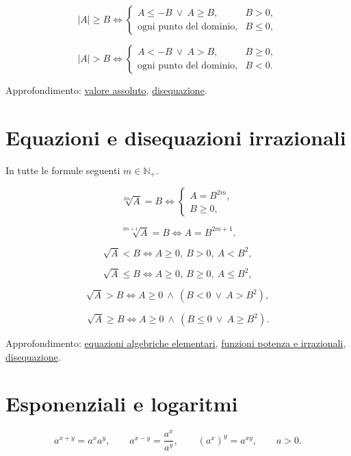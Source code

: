 \[
|A|\ge B
\Longleftrightarrow
\begin{cases}
A\le-B\ \lor\ A\ge B,&B>0,\\
\text{ogni punto del dominio},&B\le0,
\end{cases}
\]

\[
|A|>B
\Longleftrightarrow
\begin{cases}
A<-B\ \lor\ A>B,&B\ge0,\\
\text{ogni punto del dominio},&B<0.
\end{cases}
\]

Approfondimento: \href{https://ingegnerismo.it/matematica/valore-assoluto/}{valore assoluto}, \href{https://ingegnerismo.it/matematica/disequazione/}{disequazione}.

\section{Equazioni e disequazioni irrazionali}\label{equazioni-e-disequazioni-irrazionali}

In tutte le formule seguenti \(m\in\mathbb N_+\).

\[
\sqrt[2m]{A}=B
\Longleftrightarrow
\begin{cases}
A=B^{2m},\\
B\ge0,
\end{cases}
\]

\[
\sqrt[2m+1]{A}=B
\Longleftrightarrow
A=B^{2m+1}.
\]

\[
\sqrt A<B
\Longleftrightarrow
A\ge0,\ B>0,\ A<B^2,
\]

\[
\sqrt A\le B
\Longleftrightarrow
A\ge0,\ B\ge0,\ A\le B^2,
\]

\[
\sqrt A>B
\Longleftrightarrow
A\ge0\ \land\ (B<0\ \lor\ A>B^2),
\]

\[
\sqrt A\ge B
\Longleftrightarrow
A\ge0\ \land\ (B\le0\ \lor\ A\ge B^2).
\]

Approfondimento: \href{https://ingegnerismo.it/matematica/equazioni-algebriche-elementari/}{equazioni algebriche elementari}, \href{https://ingegnerismo.it/matematica/funzioni-potenza-e-irrazionali/}{funzioni potenza e irrazionali}, \href{https://ingegnerismo.it/matematica/disequazione/}{disequazione}.

\section{Esponenziali e logaritmi}\label{esponenziali-e-logaritmi}

\[
a^{x+y}=a^xa^y,
\qquad
a^{x-y}=\frac{a^x}{a^y},
\qquad
(a^x)^y=a^{xy},
\qquad a>0.
\]

